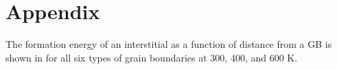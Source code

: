 \documentclass[review]{elsarticle}
\begin{document}
 \newpage
 
\section{Appendix}
\setcounter{figure}{0}
\setcounter{table}{0}
\renewcommand{\thefigure}{A\arabic{figure}}
\renewcommand{\thetable}{A\arabic{table}}
\setlength{\arrayrulewidth}{.5mm}
\setlength{\tabcolsep}{12pt}
\renewcommand{\arraystretch}{1.0}

The formation energy of an interstitial as a function of distance from a GB is shown in  for all six types of grain boundaries at 300, 400, and 600 K.

\begin{figure}[h!]
\centering
{}
 \\

\end{figure}
\end{document}
